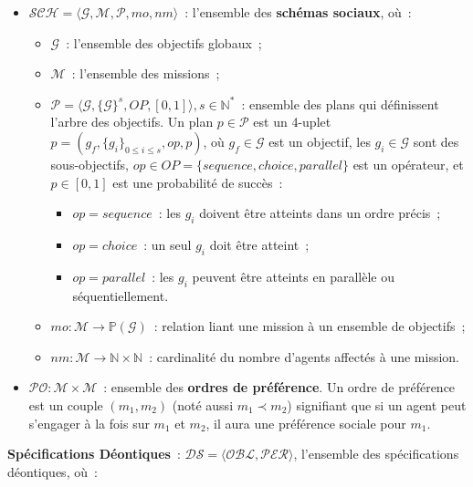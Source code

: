 \documentclass[francais,ROIA,Unicode,manuscript]{cedram}
\begin{document}
\begin{itemize}
    \item $\mathcal{SCH} = \langle\mathcal{G}, \mathcal{M}, \mathcal{P}, mo, nm \rangle$~: l'ensemble des \textbf{schémas sociaux}, où~:
          \begin{itemize}
              \item $\mathcal{G}$~: l'ensemble des objectifs globaux~;
              \item $\mathcal{M}$~: l'ensemble des missions~;
              \item $\mathcal{P} = \langle \mathcal{G}, \{\mathcal{G}\}^s, OP, [0,1] \rangle, s \in \mathbb{N}^*$~: ensemble des plans qui définissent l'arbre des objectifs.
                    Un plan $p \in \mathcal{P}$ est un 4-uplet $p = (g_f, \{g_i\}_{0 \leq i \leq s}, op, p)$, où $g_f \in \mathcal{G}$ est un objectif, les $g_i \in \mathcal{G}$ sont des sous-objectifs, $op \in OP = \{sequence, choice, parallel\}$ est un opérateur, et $p \in [0,1]$ est une probabilité de succès~:
                    \begin{itemize}
                        \item $op = sequence$~: les $g_i$ doivent être atteints dans un ordre précis~;
                        \item $op = choice$~: un seul $g_i$ doit être atteint~;
                        \item $op = parallel$~: les $g_i$ peuvent être atteints en parallèle ou séquentiellement.
                    \end{itemize}
              \item $mo: \mathcal{M} \rightarrow \mathbb{P}(\mathcal{G})$~: relation liant une mission à un ensemble de objectifs~;
              \item $nm: \mathcal{M} \rightarrow \mathbb{N} \times \mathbb{N}$~: cardinalité du nombre d'agents affectés à une mission.
          \end{itemize}
    \item $\mathcal{PO}: \mathcal{M} \times \mathcal{M}$~: ensemble des \textbf{ordres de préférence}. Un ordre de préférence est un couple $(m_1, m_2)$ (noté aussi $m_1 \prec m_2$) signifiant que si un agent peut s'engager à la fois sur $m_1$ et $m_2$, il aura une préférence sociale pour $m_1$.
\end{itemize}

\medskip

\noindent \textbf{Spécifications Déontiques}~: \quad $\mathcal{DS} = \langle \mathcal{OBL}, \mathcal{PER} \rangle$, l'ensemble des spécifications déontiques, où~:
\end{document}
